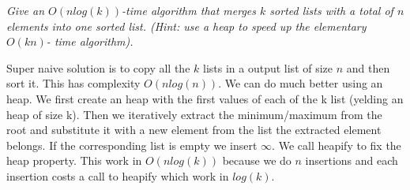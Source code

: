 \begin{problem}
\textit{Give an $O(n log(k))$-time algorithm that merges $k$ sorted lists with a total of $n$
elements into one sorted list. (Hint: use a heap to speed up the elementary $O(kn)$-
time algorithm).}

\begin{solution}
Super naive solution is to copy all the $k$ lists in a output list of size $n$ and then sort it. This has complexity $O(nlog(n))$.
We can do much better using an heap. We first create an heap with the first values of each of the k list (yelding an heap of size k). Then we iteratively extract the minimum/maximum from the root and substitute it with a new element from the list the extracted element belongs. If the corresponding list is empty we insert $\infty$. We call heapify to fix the heap property.
This work in $O(nlog(k))$ because we do $n$ insertions and each insertion costs a call to heapify which work in $log(k)$.

\end{solution}
\end{problem}



